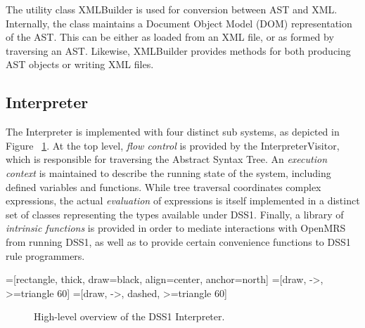 \documentclass[12pt,letterpaper]{article}
\begin{document}
{The utility class XMLBuilder is used for conversion between AST and XML. Internally, the class maintains a Document Object Model (DOM) representation of the AST. This can be either as loaded from an XML file, or as formed by traversing an AST. Likewise, XMLBuilder provides methods for both producing AST objects or writing XML files.

\subsection{Interpreter} \label{sec:INTERPRETER}

The Interpreter is implemented with four distinct sub systems, as depicted in Figure ~\ref{fig:INTERPRETER}.
At the top level, \emph{flow control} is provided by the InterpreterVisitor, which is responsible for traversing the Abstract Syntax Tree. An \emph{execution context} is maintained to describe the running state of the system, including defined variables and functions. While tree traversal coordinates complex expressions, the actual \emph{evaluation} of expressions is itself implemented in a distinct set of classes representing the types available under DSS1. Finally, a library of \emph{intrinsic functions} is provided in order to mediate interactions with OpenMRS from running DSS1, as well as to provide certain convenience functions to DSS1 rule programmers.

=[rectangle,
                   thick, 
                   draw=black, 
                   align=center,
                   anchor=north]
=[draw, ->, >=triangle 60]
=[draw, ->, dashed, >=triangle 60]
\begin{figure}
\begin{center}
\end{center}
\caption{High-level overview of the DSS1 Interpreter.}
\label{fig:INTERPRETER}
\end{figure}

}
\end{document}
